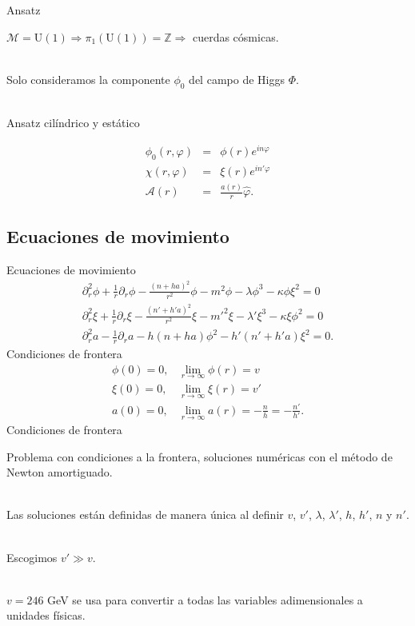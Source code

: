 \documentclass[14pt]{beamer}
\begin{document}
\begin{frame}{Ansatz}

$\mathcal{M} = \text{U}(1) \Rightarrow \pi_1(\text{U}(1)) = \mathbb{Z} \Rightarrow$ cuerdas cósmicas. \\~\

Solo consideramos la componente $\phi_0$ del campo de Higgs $\Phi$. \\~\

Ansatz cilíndrico y estático

\begin{eqnarray*}
	\phi_0(r,\varphi) & = & \phi(r) e^{in\varphi} \\
	\chi(r,\varphi) & = & \xi(r) e^{in'\varphi} \\
	\mathbf{\mathcal{A}}(r) & = & \frac{a(r)}{r} \hat{\varphi}.
\end{eqnarray*}

\end{frame}
\subsection{Ecuaciones de movimiento}
\begin{frame}{Ecuaciones de movimiento}
\begin{eqnarray*}
\partial_r^2 \phi + \frac{1}{r} \partial_r \phi- \frac{\left(n+ha\right)^2}{r^2}\phi- m^2 \phi- \lambda \phi^3-\kappa \phi \xi^2 = 0 \\
\partial_r^2 \xi + \frac{1}{r} \partial_r \xi - \frac{\left(n'+h'a\right)^2}{r^2}\xi -m'^2\xi - \lambda' \xi^3 -\kappa \xi \phi^2 = 0\\
\partial_r^2a -\frac{1}{r}\partial_r a-h(n+ha)\phi^2-h'(n' + h'a )\xi^2 = 0.
\end{eqnarray*}
Condiciones de frontera
\begin{eqnarray*}
	\phi(0)=0, & \displaystyle\lim_{r\to\infty}\phi(r) = v \\
	 \xi(0)=0, &  \displaystyle\lim_{r\to\infty}\xi(r) = v' \\
	 a(0)=0, & \displaystyle \lim_{r\to\infty}a(r) = -\frac{n}{h}=-\frac{n'}{h'} .
\end{eqnarray*}
Condiciones de frontera
\end{frame}

\begin{frame}

Problema  con condiciones a la frontera, soluciones numéricas con el método de Newton amortiguado.\\~\

Las soluciones están definidas de manera única al definir $v$, $v'$, $\lambda$, $\lambda'$, $h$, $h'$, $n$ y $n'$.\\~\

Escogimos $v'\gg v$. \\~\

$v=246$ GeV se usa para convertir a todas las variables adimensionales a unidades físicas.
\end{frame}
\end{document}
